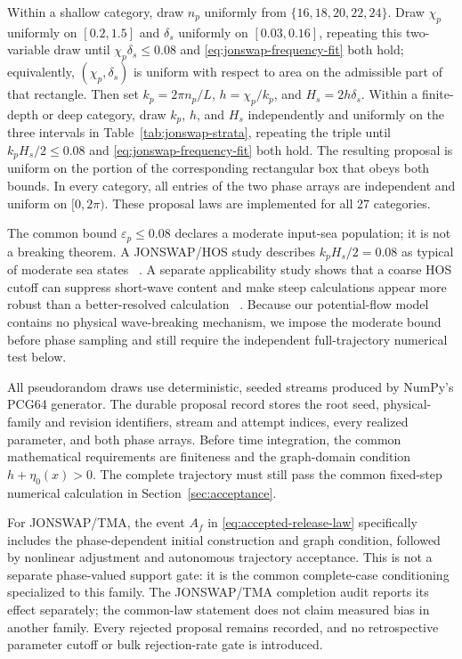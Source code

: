 \documentclass[11pt]{article}
\newcommand{\eps}{\varepsilon}
\begin{document}
Within a shallow category, draw $n_p$ uniformly from
$\{16,18,20,22,24\}$.  Draw $\chi_p$ uniformly on $[0.2,1.5]$ and
$\delta_s$ uniformly on $[0.03,0.16]$, repeating this two-variable draw until
$\chi_p\delta_s\leq0.08$ and \eqref{eq:jonswap-frequency-fit} both hold;
equivalently, $(\chi_p,\delta_s)$ is uniform with respect to area on the
admissible part of that rectangle.  Then set
$k_p=2\pi n_p/L$, $h=\chi_p/k_p$, and $H_s=2h\delta_s$.  Within a
finite-depth or deep category, draw $k_p$, $h$, and $H_s$ independently and
uniformly on the three intervals in Table~\ref{tab:jonswap-strata}, repeating
the triple until $k_pH_s/2\leq0.08$ and
\eqref{eq:jonswap-frequency-fit} both hold.  The resulting proposal is uniform
on the portion of the corresponding rectangular box that obeys both bounds.
In every category, all entries of the two phase arrays are independent and uniform on
$[0,2\pi)$.  These proposal laws are implemented for all 27 categories.

The common bound $\eps_p\leq0.08$ declares a moderate input-sea population;
it is not a breaking theorem.  A JONSWAP/HOS study describes
$k_pH_s/2=0.08$ as typical of moderate sea states
~\cite{ducrozet2021rogue}.  A separate applicability study shows that a
coarse HOS cutoff can suppress short-wave content and make steep calculations
appear more robust than a better-resolved calculation
~\cite{ducrozet2017applicability}.  Because our potential-flow model contains
no physical wave-breaking mechanism, we impose the moderate bound before
phase sampling and still require the independent full-trajectory numerical
test below.

All pseudorandom draws use deterministic, seeded streams produced by NumPy's
PCG64 generator.  The durable proposal record stores the root seed,
physical-family and revision identifiers, stream and attempt indices, every
realized parameter, and both phase arrays.
Before time integration, the common mathematical requirements are finiteness
and the graph-domain condition
$h+\eta_0(x)>0$.  The complete trajectory must still pass the common
fixed-step numerical calculation in
Section~\ref{sec:acceptance}.

For JONSWAP/TMA, the event \(A_f\) in
\eqref{eq:accepted-release-law} specifically includes the phase-dependent
initial construction and graph condition, followed by nonlinear adjustment
and autonomous trajectory acceptance.  This is not a separate phase-valued
support gate: it is the common complete-case conditioning specialized to this
family.  The JONSWAP/TMA completion audit reports its effect separately; the
common-law statement does not claim measured bias in another family.  Every
rejected proposal remains recorded, and no retrospective parameter cutoff or
bulk rejection-rate gate is introduced.
\end{document}
